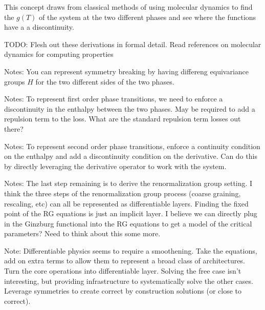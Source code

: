 \documentclass[book.tex]{subfiles}
\begin{document}
This concept draws from classical methods of using molecular dynamics to find the $g(T)$ of the system at the two different phases and see where the functions have a a discontinuity.

TODO: Flesh out these derivations in formal detail. Read references on molecular dynamics for computing properties

Notes: You can represent symmetry breaking by having differeng equivariance groups $H$ for the two different sides of the two phases.

Notes: To represent first order phase transitions, we need to enforce a discontinuity in the enthalpy between the two phases. May be required to add a repulsion term to the loss. What are the standard repulsion term losses out there?

Notes: To represent second order phase transitions, enforce a continuity condition on the enthalpy and add a discontinuity condition on the  derivative. Can do this by directly leveraging the derivative operator to work with the system.

Notes: The last step remaining is to derive the renormalization group setting. I think the three steps of the renormalization group process (coarse graining, rescaling, etc) can all be represented as differentiable layers. Finding the fixed point of the RG equations is just an implicit layer. I believe we can directly plug in the Ginzburg functional into the RG equations to get a model of the critical parameters? Need to think about this some more.

Note: Differentiable physics seems to require a smoothening. Take the equations, add on extra terms to allow them to represent a broad class of architectures. Turn the core operations into differentiable layer. Solving the free case isn't interesting, but providing infrastructure to systematically solve the other cases. Leverage symmetries to create correct by construction solutions (or close to correct).
\end{document}
